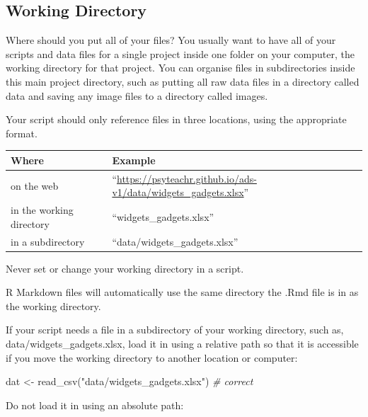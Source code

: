 \documentclass[
  oneside]{book}
\newenvironment{Shaded}{\begin{snugshade}}{\end{snugshade}}
\newcommand{\CommentTok}[1]{\textcolor[rgb]{0.56,0.35,0.01}{\textit{#1}}}
\newcommand{\FunctionTok}[1]{\textcolor[rgb]{0.00,0.00,0.00}{#1}}
\newcommand{\NormalTok}[1]{#1}
\newcommand{\OtherTok}[1]{\textcolor[rgb]{0.56,0.35,0.01}{#1}}
\newcommand{\StringTok}[1]{\textcolor[rgb]{0.31,0.60,0.02}{#1}}
\begin{document}
\hypertarget{working-directory}{%
\subsection{Working Directory}\label{working-directory}}

Where should you put all of your files? You usually want to have all of your scripts and data files for a single project inside one folder on your computer, the working directory for that project. You can organise files in subdirectories inside this main project directory, such as putting all raw data files in a directory called data and saving any image files to a directory called images.

Your script should only reference files in three locations, using the appropriate format.

\begin{longtable}[]{@{}ll@{}}
\toprule
Where & Example \\
\midrule
\endhead
on the web & ``\url{https://psyteachr.github.io/ads-v1/data/widgets_gadgets.xlsx}'' \\
in the working directory & ``widgets\_gadgets.xlsx'' \\
in a subdirectory & ``data/widgets\_gadgets.xlsx'' \\
\bottomrule
\end{longtable}

\begin{warning}
Never set or change your working directory in a script.

\end{warning}

R Markdown files will automatically use the same directory the .Rmd file is in as the working directory.

If your script needs a file in a subdirectory of your working directory, such as, data/widgets\_gadgets.xlsx, load it in using a relative path so that it is accessible if you move the working directory to another location or computer:

\begin{Shaded}
\begin{Highlighting}[]
\NormalTok{dat }\OtherTok{\textless{}{-}} \FunctionTok{read\_csv}\NormalTok{(}\StringTok{"data/widgets\_gadgets.xlsx"}\NormalTok{)  }\CommentTok{\# correct}
\end{Highlighting}
\end{Shaded}

Do not load it in using an absolute path:
\end{document}
